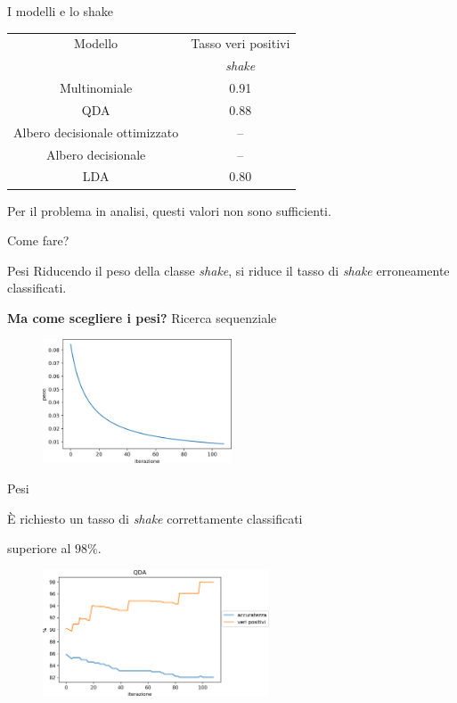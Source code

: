 \documentclass{beamer}
\begin{document}
\begin{frame}{I modelli e lo shake}
\begin{table}[H]
\begin{tabular}{cc}
\toprule
Modello & Tasso veri positivi \\
& \emph{shake} \\
\midrule
Multinomiale & 0.91\\
QDA & 0.88\\
Albero decisionale ottimizzato & --\\
Albero decisionale & --\\
LDA & 0.80\\
\bottomrule
\end{tabular}
\end{table}

Per il problema in analisi, questi valori non sono sufficienti. 

Come fare?
\end{frame}

\begin{frame}{Pesi}
Riducendo il peso della classe {\em shake}, si riduce il tasso di {\em shake} erroneamente classificati.

\textbf{Ma come scegliere i pesi?} \pause Ricerca sequenziale
\begin{figure}[H]
\includegraphics[width=0.5\textwidth]{../figure/andamento-pesi.png}
\end{figure}

\end{frame}

\begin{frame}{Pesi}
\begin{center}
È richiesto un tasso di {\em shake} correttamente classificati 

superiore al $98\%$.
\end{center}
\begin{figure}[H]
\includegraphics[width=0.6\textwidth]{../figure/acc-vs-veripos-qda.png}  
\end{figure}

\end{frame}
\end{document}
